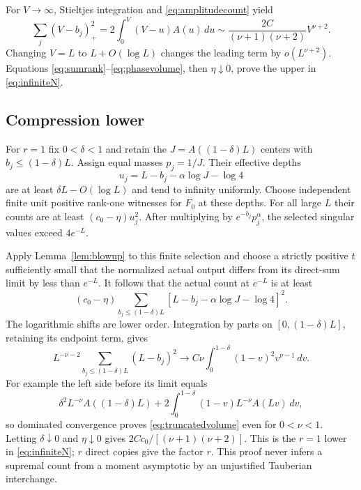 \documentclass[11pt]{article}
\numberwithin{equation}{section}
\begin{document}
For $V\to\infty$, Stieltjes integration and
\eqref{eq:amplitudecount} yield
\begin{equation}\label{eq:phasevolume}
 \sum_j(V-b_j)_+^2
 =2\int_0^V(V-u)A(u)\,du
 \sim\frac{2C}{(\nu+1)(\nu+2)}V^{\nu+2}.
\end{equation}
Changing $V=L$ to $L+O(\log L)$ changes the leading term by
$o(L^{\nu+2})$. Equations \eqref{eq:sumrank}--\eqref{eq:phasevolume},
then $\eta\downarrow0$, prove the upper in \eqref{eq:infiniteN}.

\subsection{Compression lower}

For $r=1$ fix $0<\delta<1$ and retain the
$J=A((1-\delta)L)$ centers with $b_j\le(1-\delta)L$.
Assign equal masses $p_j=1/J$. Their effective depths
\begin{equation}\label{eq:effectivedepth}
 u_j=L-b_j-\alpha\log J-\log4
\end{equation}
are at least $\delta L-O(\log L)$ and tend to infinity uniformly.
Choose independent finite unit positive rank-one witnesses for $F_0$
at these depths. For all large $L$ their counts are at least
$(c_0-\eta)u_j^2$.
After multiplying by $e^{-b_j}p_j^\alpha$, the selected singular
values exceed $4e^{-L}$.

Apply Lemma~\ref{lem:blowup} to this finite selection and choose a
strictly positive $t$ sufficiently small that the normalized actual
output differs from its direct-sum limit by less than $e^{-L}$.
It follows that the actual count at $e^{-L}$ is at least
\begin{equation}\label{eq:lowercount}
 (c_0-\eta)\sum_{b_j\le(1-\delta)L}
              [L-b_j-\alpha\log J-\log4]^2.
\end{equation}
The logarithmic shifts are lower order. Integration by parts on
$[0,(1-\delta)L]$, retaining its endpoint term, gives
\begin{equation}\label{eq:truncatedvolume}
 L^{-\nu-2}\sum_{b_j\le(1-\delta)L}(L-b_j)^2
 \longrightarrow
 C\nu\int_0^{1-\delta}(1-v)^2v^{\nu-1}\,dv.
\end{equation}
For example the left side before its limit equals
\[
 \delta^2 L^{-\nu}A((1-\delta)L)
 +2\int_0^{1-\delta}(1-v)L^{-\nu}A(Lv)\,dv,
\]
so dominated convergence proves \eqref{eq:truncatedvolume} even for
$0<\nu<1$. Letting $\delta\downarrow0$ and $\eta\downarrow0$ gives
$2C c_0/[(\nu+1)(\nu+2)]$.
This is the $r=1$ lower in \eqref{eq:infiniteN}; $r$ direct copies
give the factor $r$. This proof never infers a supremal count from a
moment asymptotic by an unjustified Tauberian interchange.
\end{document}
